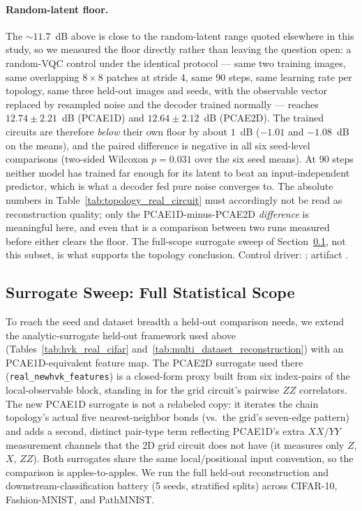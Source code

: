 \documentclass[11pt]{article}
\begin{document}
\paragraph{Random-latent floor.} The $\sim\!11.7$~dB above is close to the random-latent range quoted elsewhere in this study, so we measured the floor directly rather than leaving the question open: a random-VQC control under the identical protocol --- same two training images, same overlapping $8\times8$ patches at stride 4, same 90 steps, same learning rate per topology, same three held-out images and seeds, with the observable vector replaced by resampled noise and the decoder trained normally --- reaches $12.74\pm2.21$~dB (PCAE1D) and $12.64\pm2.12$~dB (PCAE2D). The trained circuits are therefore \emph{below} their own floor by about $1$~dB ($-1.01$ and $-1.08$~dB on the means), and the paired difference is negative in all six seed-level comparisons (two-sided Wilcoxon $p=0.031$ over the six seed means). At 90 steps neither model has trained far enough for its latent to beat an input-independent predictor, which is what a decoder fed pure noise converges to. The absolute numbers in Table~\ref{tab:topology_real_circuit} must accordingly not be read as reconstruction quality; only the PCAE1D-minus-PCAE2D \emph{difference} is meaningful here, and even that is a comparison between two runs measured before either clears the floor. The full-scope surrogate sweep of Section~\ref{sec:topology_surrogate}, not this subset, is what supports the topology conclusion. Control driver: ; artifact .

\subsection{Surrogate Sweep: Full Statistical Scope}
\label{sec:topology_surrogate}
To reach the seed and dataset breadth a held-out comparison needs, we extend the analytic-surrogate held-out framework used above (Tables~\ref{tab:hvk_real_cifar} and~\ref{tab:multi_dataset_reconstruction}) with an PCAE1D-equivalent feature map. The PCAE2D surrogate used there (\texttt{real\_newhvk\_features}) is a closed-form proxy built from six index-pairs of the local-observable block, standing in for the grid circuit's pairwise $ZZ$ correlators. The new PCAE1D surrogate is not a relabeled copy: it iterates the chain topology's actual five nearest-neighbor bonds (vs.\ the grid's seven-edge pattern) and adds a second, distinct pair-type term reflecting PCAE1D's extra $XX$/$YY$ measurement channels that the 2D grid circuit does not have (it measures only $Z$, $X$, $ZZ$). Both surrogates share the same local/positional input convention, so the comparison is apples-to-apples. We run the full held-out reconstruction and downstream-classification battery (5 seeds, stratified splits) across CIFAR-10, Fashion-MNIST, and PathMNIST.
\end{document}
